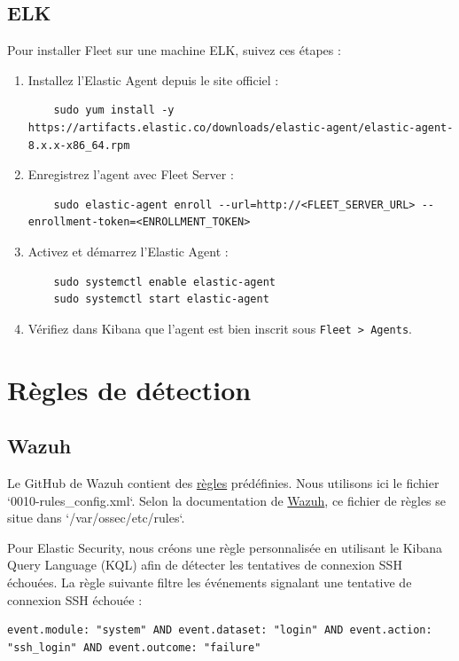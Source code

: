 \documentclass{article}
\begin{document}
\subsection{ELK}
Pour installer Fleet sur une machine ELK, suivez ces étapes :

\begin{enumerate}
    \item Installez l'Elastic Agent depuis le site officiel : 
    \begin{verbatim}
    sudo yum install -y https://artifacts.elastic.co/downloads/elastic-agent/elastic-agent-8.x.x-x86_64.rpm
    \end{verbatim}
    \item Enregistrez l'agent avec Fleet Server :
    \begin{verbatim}
    sudo elastic-agent enroll --url=http://<FLEET_SERVER_URL> --enrollment-token=<ENROLLMENT_TOKEN>
    \end{verbatim}
    \item Activez et démarrez l'Elastic Agent :
    \begin{verbatim}
    sudo systemctl enable elastic-agent
    sudo systemctl start elastic-agent
    \end{verbatim}
    \item Vérifiez dans Kibana que l'agent est bien inscrit sous \texttt{Fleet > Agents}.
\end{enumerate}

\section{Règles de détection}

\subsection{Wazuh}
Le GitHub de Wazuh contient des \href{https://github.com/wazuh/wazuh/tree/master/ruleset/rules}{règles} prédéfinies. Nous utilisons ici le fichier `0010-rules\_config.xml`. Selon la documentation de \href{https://documentation.wazuh.com/current/user-manual/ruleset/index.html}{Wazuh}, ce fichier de règles se situe dans `/var/ossec/etc/rules`.

Pour Elastic Security, nous créons une règle personnalisée en utilisant le Kibana Query Language (KQL) afin de détecter les tentatives de connexion SSH échouées. La règle suivante filtre les événements signalant une tentative de connexion SSH échouée :

\begin{verbatim}
event.module: "system" AND event.dataset: "login" AND event.action: "ssh_login" AND event.outcome: "failure"
\end{verbatim}
\end{document}
